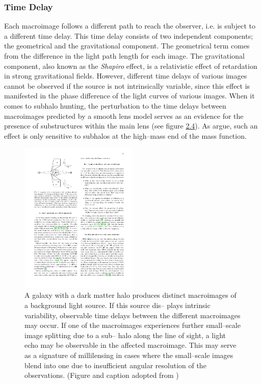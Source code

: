 \documentclass[paper=a4, fontsize=11pt]{scrartcl} %
\numberwithin{equation}{section} %
\numberwithin{figure}{section} %
\numberwithin{table}{section} %
\begin{document}
 \subsubsection{Time Delay}
 Each macroimage follows a different path to reach the observer, i.e. is subject to a different time delay. This time delay consists of two independent components; the geometrical and the gravitational component. The geometrical term comes from the difference in the light path length for each image. The gravitational component, also known as the \emph{Shapiro} effect, is a relativistic effect of retardation in strong gravitational fields. However, different time delays of various images cannot be observed if the source is not intrinsically variable, since this effect is manifested in the phase difference of the light curves of various images. When it comes to subhalo hunting, the perturbation to the time delays between macroimages predicted by a smooth lens model serves as an evidence for the presence of substructures within the main lens (see figure \hyperref[fig:time_delay]{2.4}). As \citet{Moustakas+2009} argue, such an effect is only sensitive to subhalos at the high--mass end of the mass function.
 
 \begin{figure}[h]
 \label{fig:time_delay}
 \centering
 \includegraphics[width=0.5\textwidth]{figs/time_delay}
 \caption{A galaxy with a dark matter halo produces distinct macroimages of a background light source. If this source dis-- plays intrinsic variability, observable time delays between the different macroimages may occur. If one of the macroimages experiences further small--scale image splitting due to a sub-- halo along the line of sight, a light echo may be observable in the affected macroimage. This may serve as a signature of millilensing in cases where the small--scale images blend into one due to insufficient angular resolution of the observations. (Figure and caption adopted from \cite{Zackrisson.Riehm2010})}
 \end{figure}
 
\end{document}
